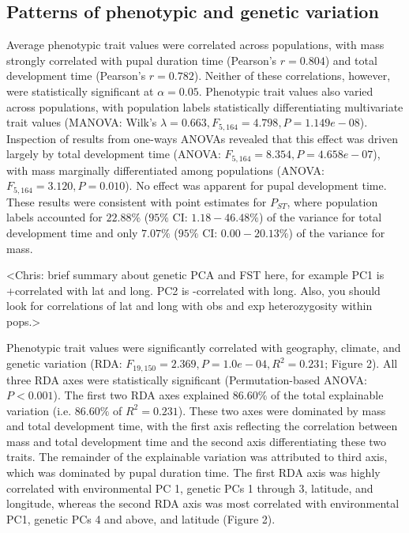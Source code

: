 \documentclass[smallextended]{svjour3}
\begin{document}
\subsection*{Patterns of phenotypic and genetic variation} Average phenotypic
trait values were correlated across populations, with mass strongly correlated
with pupal duration time (Pearson's $r = 0.804$) and total development time
(Pearson's $r = 0.782$).  Neither of these correlations, however, were
statistically significant at $\alpha = 0.05$. Phenotypic trait values also
varied across populations, with population labels statistically differentiating
multivariate trait values (MANOVA: Wilk's $\lambda = 0.663, F_{5,164} = 4.798,P =
1.149e-08$). Inspection of results from one-ways ANOVAs revealed that this
effect was driven largely by total development time (ANOVA: $F_{5,164} = 8.354,P =
4.658e-07$), with mass marginally differentiated among populations (ANOVA:
$F_{5,164} = 3.120,P = 0.010$). No effect was apparent for pupal development
time. These results were consistent with point estimates for $P_{ST}$, where
population labels accounted for $22.88\%$ ($95\%$ CI: $1.18 - 46.48\%$) of the
variance for total development time and only $7.07\%$ ($95\%$ CI: $0.00 -
20.13\%$) of the variance for mass.

<Chris: brief summary about genetic PCA and FST here, for example PC1 is
+correlated with lat and long. PC2 is -correlated with long. Also, you should
look for correlations of lat and long with obs and exp heterozygosity within
pops.>

Phenotypic trait values were significantly correlated with geography, climate,
and genetic variation (RDA: $F_{19,150} = 2.369, P = 1.0e-04, R^2 = 0.231$;
Figure 2). All three RDA axes were statistically significant (Permutation-based
ANOVA: $P < 0.001$). The first two RDA axes explained $86.60\%$ of the total
explainable variation (i.e. $86.60\%$ of $R^2 = 0.231$). These two axes were
dominated by mass and total development time, with the first axis reflecting the
correlation between mass and total development time and the second axis
differentiating these two traits. The remainder of the explainable variation was
attributed to third axis, which was dominated by pupal duration time. The first
RDA axis was highly correlated with environmental PC 1, genetic PCs 1 through 3,
latitude, and longitude, whereas the second RDA axis was most correlated with
environmental PC1, genetic PCs 4 and above, and latitude (Figure 2).
\end{document}
